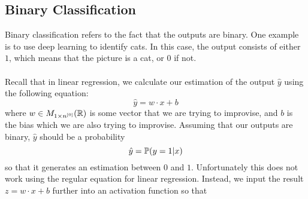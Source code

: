 \documentclass[a4paper]{article}
\begin{document}
\subsection{Binary Classification}
Binary classification refers to the fact that the outputs are binary. One example is to use deep learning to identify cats. In this case, the output consists of either $1$, which means that the picture is a cat, or $0$ if not. \\~\\
Recall that in linear regression, we calculate our estimation of the output $\hat{y}$ using the following equation: $$\hat{y}=w\cdot x+b$$ where $w\in M_{1\times n^{[0]}}(\mathbb{R})$ is some vector that we are trying to improvise, and $b$ is the bias which we are also trying to improvise. Assuming that our outputs are binary, $\hat{y}$ should be a probability $$\hat{y}=\mathbb{P}(y=1|x)$$ so that it generates an estimation between $0$ and $1$. Unfortunately this does not work using the regular equation for linear regression. Instead, we input the result $z=w\cdot x+b$ further into an activation function so that 
\end{document}
